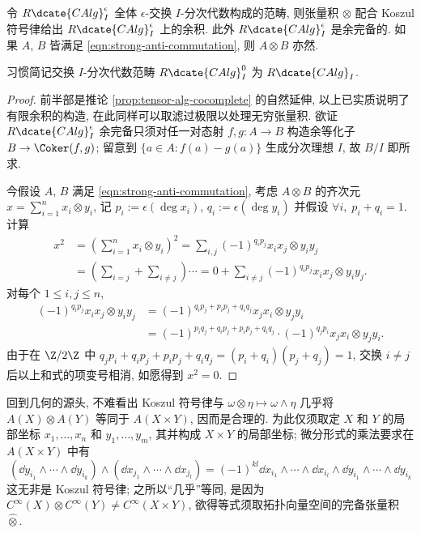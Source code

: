 \begin{proposition}\label{prop:graded-alg-cocomplete}
	令 $R\dcate{CAlg}^\epsilon_I$ 全体 $\epsilon$-交换 $I$-分次代数构成的范畴, 则张量积 $\otimes$ 配合 Koszul 符号律给出 $R\dcate{CAlg}^\epsilon_I$ 上的余积. 此外 $R\dcate{CAlg}^\epsilon_I$ 是余完备的. 如果 $A$, $B$ 皆满足 \eqref{eqn:strong-anti-commutation}, 则 $A \otimes B$ 亦然.
\end{proposition}
习惯简记交换 $I$-分次代数范畴 $R\dcate{CAlg}^0_I$ 为 $R\dcate{CAlg}_I$.
\begin{proof}
	前半部是推论 \ref{prop:tensor-alg-cocomplete} 的自然延伸, 以上已实质说明了有限余积的构造, 在此同样可以取滤过极限以处理无穷张量积. 欲证 $R\dcate{CAlg}^\epsilon_I$ 余完备只须对任一对态射 $f,g: A \to B$ 构造余等化子 $B \to \Coker(f,g)$; 留意到 $\{a \in A:f(a)-g(a) \}$ 生成分次理想 $I$, 故 $B/I$ 即所求.
	
	今假设 $A$, $B$ 满足 \eqref{eqn:strong-anti-commutation}, 考虑 $A \otimes B$ 的齐次元 $x = \sum_{i=1}^n x_i \otimes y_i$, 记 $p_i := \epsilon(\deg x_i)$, $q_i := \epsilon(\deg y_i)$ 并假设 $\forall i,\; p_i+q_i=1$. 计算
	\begin{align*}
		x^2 & = \left( \sum_{i=1}^n x_i \otimes y_i \right)^2 = \sum_{i,j} (-1)^{q_i p_j} x_i x_j \otimes y_i y_j \\
		& = \left( \sum_{i=j} + \sum_{i \neq j} \right) \cdots
		= 0 + \sum_{i \neq j} (-1)^{q_i p_j} x_i x_j \otimes y_i y_j.
	\end{align*}
	对每个 $1 \leq i,j \leq n$,
	\begin{align*}
		(-1)^{q_i p_j} x_i x_j \otimes y_i y_j & = (-1)^{q_i p_j + p_i p_j + q_i q_j} x_j x_i \otimes y_j y_i \\
		& = (-1)^{p_i q_j + q_i p_j + p_i p_j + q_i q_j} \cdot (-1)^{q_j p_i} x_j x_i \otimes y_j y_i.
	\end{align*}
	由于在 $\Z/2\Z$ 中 $q_j p_i + q_i p_j + p_i p_j + q_i q_j = (p_i + q_i)(p_j + q_j) = 1$, 交换 $i \neq j$ 后以上和式的项变号相消, 如愿得到 $x^2=0$.
\end{proof}

回到几何的源头, 不难看出 Koszul 符号律与 $\omega \otimes \eta \mapsto \omega \wedge \eta$ 几乎将 $A(X) \otimes A(Y)$ 等同于 $A(X \times Y)$, 因而是合理的. 为此仅须取定 $X$ 和 $Y$ 的局部坐标 $x_1, \ldots, x_n$ 和 $y_1, \ldots, y_m$, 其并构成 $X \times Y$ 的局部坐标; 微分形式的乘法要求在 $A(X \times Y)$ 中有
\[ \left( \dd y_{i_1} \wedge \cdots \wedge \dd y_{i_k} \right) \wedge \left( \dd  x_{j_1} \wedge \cdots \wedge \dd x_{j_l} \right) = (-1)^{kl} \dd x_{i_1} \wedge \cdots \wedge \dd x_{i_l} \wedge \dd y_{i_1} \wedge \cdots \wedge \dd y_{i_k} \]
这无非是 Koszul 符号律; 之所以``几乎''等同, 是因为 $C^\infty(X) \otimes C^\infty(Y) \neq C^\infty(X \times Y)$, 欲得等式须取拓扑向量空间的完备张量积 $\hat{\otimes}$.

